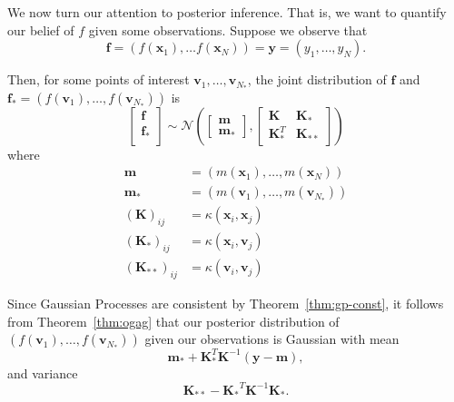 We now turn our attention to posterior inference.
That is, we want to quantify our belief of $f$ given some observations.
Suppose we observe that 
\begin{equation*}
    \mathbf{f} = (f(\mathbf{x}_1), \ldots f(\mathbf{x}_N)) = \mathbf{y} = (y_1, \ldots, y_N).
\end{equation*}

Then, for some points of interest $\mathbf{v}_{1}, \ldots, \mathbf{v}_{N_{*}}$, the joint distribution of $\mathbf{f}$ and $\mathbf{f}_* = (f(\mathbf{v}_1), \ldots, f(\mathbf{v}_{N_*}))$ is
\begin{equation*}
    \begin{bmatrix}
        \mathbf{f} \\
        \mathbf{f}_{*} \\
    \end{bmatrix} \sim
    \mathcal{N}\left(
    \begin{bmatrix}
        \mathbf{m} \\ \mathbf{m}_{*}
    \end{bmatrix},
    \begin{bmatrix}
        \mathbf{K} & \mathbf{K}_* \\
        \mathbf{K}_*^T & \mathbf{K}_{* *}
    \end{bmatrix}\right)
\end{equation*}
where 
\begin{align*}
    \mathbf{m} &= (m(\mathbf{x}_1), \ldots, m(\mathbf{x}_N)) \\
    \mathbf{m_*} &= (m(\mathbf{v}_1), \ldots, m(\mathbf{v}_{N_{*}})) \\
    (\mathbf{K})_{ij} &= \kappa(\mathbf{x}_i, \mathbf{x}_j) \\
    (\mathbf{K}_*)_{ij} &= \kappa(\mathbf{x}_i, \mathbf{v}_j) \\
    (\mathbf{K}_{* *})_{ij} &= \kappa(\mathbf{v}_i, \mathbf{v}_j)
\end{align*}

Since Gaussian Processes are consistent by Theorem~\ref{thm:gp-const}, it follows from Theorem~\ref{thm:ogag} that our posterior distribution
of $(f(\mathbf{v}_1), \ldots, f(\mathbf{v}_{N_*}))$ given our observations is Gaussian with mean
\begin{equation} \label{eq:noisless-post-mean}
    \mathbf{m}_* + \mathbf{K}_*^T \mathbf{K}^{-1} (\mathbf{y} - \mathbf{m}), 
\end{equation}
and variance
\begin{equation} \label{eq:noiseless-post-var}
    \mathbf{K}_{* *} - \mathbf{K_*}^{T} \mathbf{K}^{-1} \mathbf{K_*}.
\end{equation}

